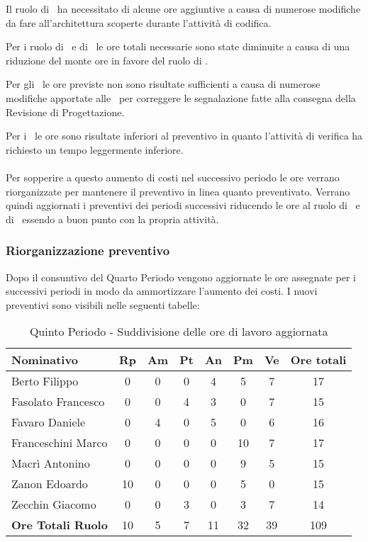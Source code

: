 \documentclass[../PianoDiProgetto_v3.0.0.tex]{subfiles}
\begin{document}
			Il ruolo di \progettista\ ha necessitato di alcune ore aggiuntive a causa di numerose modifiche da fare all'architettura scoperte durante l'attività di codifica. 
			
			Per i ruolo di \responsabilediprogetto\ e di \programmatore\ le ore totali necessarie sono state diminuite a causa di una riduzione del monte ore in favore del ruolo di \progettista.
			
			Per gli \amministratori\ le ore previste non sono risultate sufficienti a causa di numerose modifiche apportate alle \normediprogettoRQ\ per correggere le segnalazione fatte alla consegna della Revisione di Progettazione.
			
			Per i \verificatori\ le ore sono risultate inferiori al preventivo in quanto l'attività di verifica ha richiesto un tempo leggermente inferiore.
			\\ \\
			Per sopperire a questo aumento di costi nel successivo periodo le ore verrano riorganizzate per mantenere il preventivo in linea quanto preventivato. Verrano quindi aggiornati i preventivi dei periodi successivi riducendo le ore al ruolo di \progettista\ e di \analista\ essendo a buon punto con la propria attività.\\
			
		\subsubsection{Riorganizzazione preventivo}
		Dopo il consuntivo del Quarto Periodo vengono aggiornate le ore assegnate per i successivi periodi in modo da ammortizzare l'aumento dei costi. I nuovi preventivi sono visibili nelle seguenti tabelle:
		
		\begin{table}[h]
			\begin{tabularx}{\textwidth}{l * {6}{C} c}
			\toprule
			\textbf{Nominativo} & \textbf{Rp} & \textbf{Am} & \textbf{Pt} & \textbf{An} & \textbf{Pm} & \textbf{Ve} & \textbf{Ore totali} \\
			\midrule
			Berto Filippo &	0 & 0 & 0 & 4 & 5 & 7 & 17 \\
			Fasolato Francesco & 0 & 0 & 4 & 3 & 0 & 7 & 15 \\
			Favaro Daniele & 0 & 4 & 0 & 5 & 0 & 6 & 16 \\
			Franceschini Marco & 0 & 0 & 0 & 0 & 10 & 7 & 17 \\
			Macrì Antonino & 0 & 0 & 0 & 0 & 9 & 5 & 15 \\
			Zanon Edoardo &	10 & 0 & 0 & 0 & 5 & 0 & 15 \\
			Zecchin Giacomo & 0 & 0 & 3 & 0 & 3 & 7 & 14 \\
			\midrule		
			\textbf{Ore Totali Ruolo} & 10 & 5 & 7 & 11 & 32 & 39 & 109 \\
			\bottomrule
			\end{tabularx}
			\caption{Quinto Periodo - Suddivisione delle ore di lavoro aggiornata}		
		\end{table}
		
\end{document}
